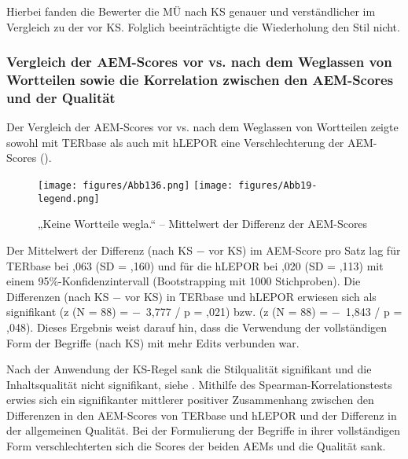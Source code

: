 Hierbei fanden die Bewerter die MÜ nach KS genauer und verständlicher im Vergleich zu der vor KS. Folglich beeinträchtigte die Wiederholung den Stil nicht.

\subsubsection{\label{sec:5.3.9.6}Vergleich der AEM-Scores vor vs. nach dem Weglassen von Wortteilen sowie die Korrelation zwischen den AEM-Scores und der Qualität}

Der Vergleich der AEM-Scores vor vs. nach dem Weglassen von Wortteilen zeigte sowohl mit TERbase als auch mit hLEPOR eine Verschlechterung der AEM-Scores ().


\begin{figure}






\texttt{[image: figures/Abb136.png]}
\texttt{[image: figures/Abb19-legend.png]}
\caption{\label{fig:05:136}„Keine Wortteile wegla.“ -- Mittelwert der Differenz der AEM-Scores   }
\end{figure}

Der Mittelwert der Differenz (nach KS $-$ vor KS) im AEM-Score pro Satz lag für TERbase bei ,063 (SD = ,160) und für die hLEPOR bei ,020 (SD = ,113) mit einem 95\%\nobreakdash-Konfidenzintervall (Bootstrapping mit 1000 Stichproben). Die Differenzen (nach KS $-$ vor KS) in TERbase und hLEPOR erwiesen sich als signifikant (z (N = 88) = $-$~3,777 / p = ,021) bzw. (z (N = 88) = $-$~1,843 / p = ,048). Dieses Ergebnis weist darauf hin, dass die Verwendung der vollständigen Form der Begriffe (nach KS) mit mehr Edits verbunden war.


Nach der Anwendung der KS-Regel sank die Stilqualität signifikant und die Inhaltsqualität nicht signifikant, siehe . Mithilfe des Spearman-Kor\-re\-la\-tions\-tests erwies sich ein signifikanter mittlerer positiver Zusammenhang zwischen den Differenzen in den AEM-Scores von TERbase und hLEPOR und der Differenz in der allgemeinen Qualität. Bei der Formulierung der Begriffe in ihrer vollständigen Form verschlechterten sich die Scores der beiden AEMs und die Qualität sank.



